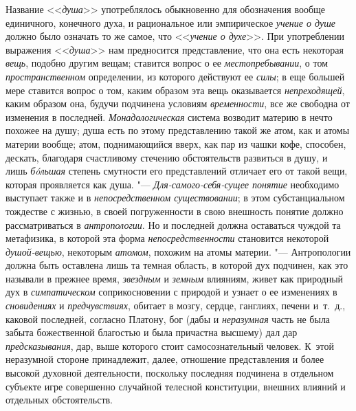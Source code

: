 Название <<{\em душа}>>
употреблялось обыкновенно для обозначения
вообще единичного, конечного духа, и рациональное или эмпирическое
{\em учение о душе}
должно было означать то же самое, что
<<{\em учение о духе}>>.
При употреблении выражения
<<{\em душа}>> нам
предносится представление, что она есть некоторая
{\em вещь}, подобно
другим вещам; ставится вопрос о ее
{\em местопребывании}, о
том {\em пространственном}
определении, из которого действуют ее
{\em силы}; в еще большей
мере ставится вопрос о том, каким образом эта вещь оказывается
{\em непреходящей}, каким
образом она, будучи подчинена условиям
{\em временности}, все же
свободна от изменения в последней.
{\em Монадологическая}
система возводит материю в нечто похожее на душу; душа есть
по этому представлению такой же атом, как и атомы материи вообще; атом,
поднимающийся вверх, как пар из чашки кофе, способен, дескать, благодаря
счастливому стечению обстоятельств развиться в душу, и лишь
{\em бóльшая} степень
смутности его представлений отличает его от такой вещи, которая проявляется
как душа. "--- {\em Для-самого-себя-сущее
понятие} необходимо выступает также и в
{\em непосредственном существовании};
в этом субстанциальном тождестве с жизнью, в своей
погруженности в свою внешность понятие должно рассматриваться в
{\em антропологии}. Но и
последней должна оставаться чуждой та метафизика, в которой эта форма
{\em непосредственности}
становится некоторой
{\em душой-вещью},
некоторым {\em атомом},
похожим на атомы материи. "--- Антропологии
должна быть оставлена лишь та темная область, в которой дух подчинен, как
это называли в прежнее время,
{\em звездным} и
{\em земным} влияниям,
живет как природный дух в
{\em симпатическом}
соприкосновении с природой и узнает о ее изменениях в
{\em сновидениях} и
{\em предчувствиях},
обитает в мозгу, сердце, ганглиях, печени и~т.~д., каковой
последней, согласно Платону, бог (дабы и
{\em неразумная} часть не
была забыта божественной благостью и была причастна высшему) дал дар
{\em предсказывания},
дар, выше которого стоит самосознательный человек. К~этой
неразумной стороне принадлежит, далее, отношение
представления и более высокой духовной деятельности, поскольку последняя
подчинена в отдельном субъекте игре совершенно случайной телесной
конституции, внешних влияний и отдельных обстоятельств.

